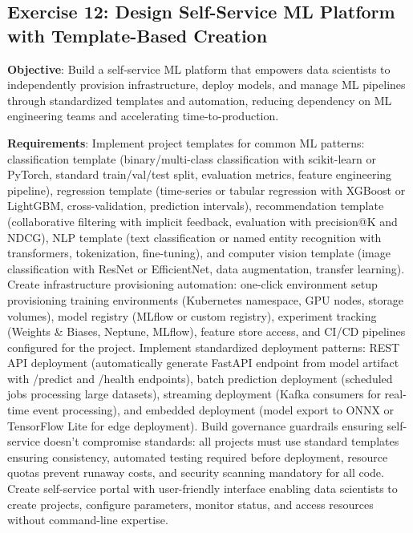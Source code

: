 \subsection{Exercise 12: Design Self-Service ML Platform with Template-Based Creation}

\textbf{Objective}: Build a self-service ML platform that empowers data scientists to independently provision infrastructure, deploy models, and manage ML pipelines through standardized templates and automation, reducing dependency on ML engineering teams and accelerating time-to-production.

\textbf{Requirements}: Implement project templates for common ML patterns: classification template (binary/multi-class classification with scikit-learn or PyTorch, standard train/val/test split, evaluation metrics, feature engineering pipeline), regression template (time-series or tabular regression with XGBoost or LightGBM, cross-validation, prediction intervals), recommendation template (collaborative filtering with implicit feedback, evaluation with precision@K and NDCG), NLP template (text classification or named entity recognition with transformers, tokenization, fine-tuning), and computer vision template (image classification with ResNet or EfficientNet, data augmentation, transfer learning). Create infrastructure provisioning automation: one-click environment setup provisioning training environments (Kubernetes namespace, GPU nodes, storage volumes), model registry (MLflow or custom registry), experiment tracking (Weights \& Biases, Neptune, MLflow), feature store access, and CI/CD pipelines configured for the project. Implement standardized deployment patterns: REST API deployment (automatically generate FastAPI endpoint from model artifact with /predict and /health endpoints), batch prediction deployment (scheduled jobs processing large datasets), streaming deployment (Kafka consumers for real-time event processing), and embedded deployment (model export to ONNX or TensorFlow Lite for edge deployment). Build governance guardrails ensuring self-service doesn't compromise standards: all projects must use standard templates ensuring consistency, automated testing required before deployment, resource quotas prevent runaway costs, and security scanning mandatory for all code. Create self-service portal with user-friendly interface enabling data scientists to create projects, configure parameters, monitor status, and access resources without command-line expertise.

